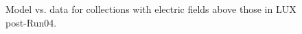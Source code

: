 \begin{figure}[!h]
\begin{subfigure}{0.5\linewidth}
\caption{}
\end{subfigure}
\caption{Model vs. data for collections with electric fields above those in LUX post-Run04.}
\label{fig:betamod_highfield}
\end{figure}

\clearpage










